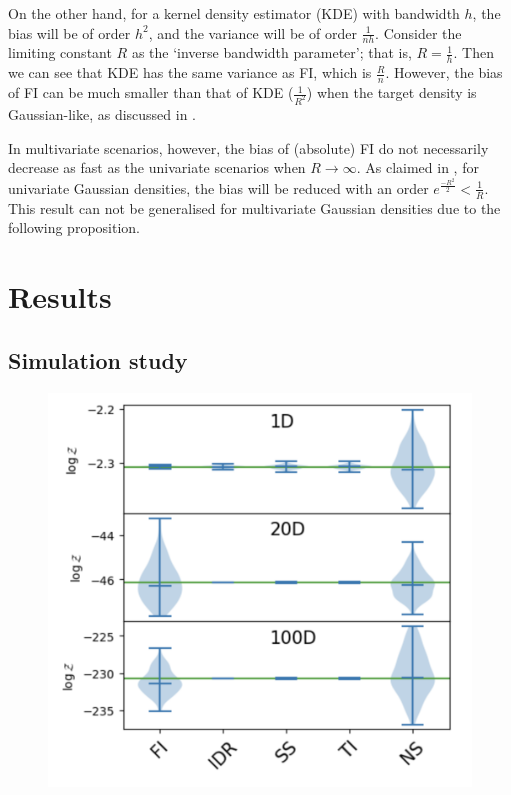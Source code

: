 \documentclass[%
 reprint,
 amsmath,amssymb,
 aps,
]{revtex4-2}
\begin{document}
On the other hand, for a kernel density estimator (KDE) with bandwidth $h$, the bias will be of order $h^2$, and the variance will be of order $\frac{1}{nh}$. Consider the limiting constant $R$ as the `inverse bandwidth parameter'; that is, $R = \frac{1}{h}$. Then we can see that KDE has the same variance as FI, which is $\frac{R}{n}$. However, the bias of FI can be much smaller than that of KDE ($\frac{1}{R^2}$) when the target density is Gaussian-like, as discussed in \cite{rotiroti2022computing}.

In multivariate scenarios, however, the bias of (absolute) FI do not necessarily decrease as fast as the univariate scenarios when $R \to \infty$. As claimed in \cite{rotiroti2022computing}, for univariate Gaussian densities, the bias will be reduced with an order $e^{\frac{-R^2}{2}} < \frac{1}{R}$. This result can not be generalised for multivariate Gaussian densities due to the following proposition.






\section{Results}

\subsection{\label{subsec:simulation study} Simulation study}







\begin{figure}
    \centering
    \includegraphics[width=0.5\linewidth]{figures/FI_simulation.png}
    \caption{}
    \label{fig:enter-label}
\end{figure}
\end{document}
